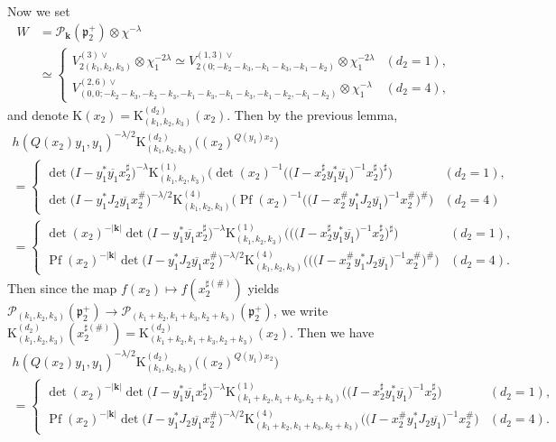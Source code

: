 \documentclass[pdftex]{sigma}
\numberwithin{equation}{section}
\newcommand{\bk}{\mathbf{k}}
\newcommand{\fp}{\mathfrak{p}}
\newcommand{\cP}{\mathcal{P}}
\newcommand{\rK}{\mathrm{K}}
\newcommand{\Pf}{\operatorname{Pf}}
\begin{document}
Now we set
\begin{align*}
W&=\cP_\bk(\fp^+_2)\otimes\chi^{-\lambda} \\
&\simeq \begin{cases} V_{2(k_1,k_2,k_3)}^{(3)\vee}\otimes\chi_1^{-2\lambda}
\simeq V_{2(0;-k_2-k_3,-k_1-k_3,-k_1-k_2)}^{(1,3)\vee}\otimes\chi_1^{-2\lambda} & (d_2=1), \\
V_{(0,0;-k_2-k_3,-k_2-k_3,-k_1-k_3,-k_1-k_3,-k_1-k_2,-k_1-k_2)}^{(2,6)\vee}\otimes\chi_1^{-\lambda} & (d_2=4), \end{cases}
\end{align*}
and denote $\rK(x_2)=\rK_{(k_1,k_2,k_3)}^{(d_2)}(x_2)$. Then by the previous lemma,
\begin{gather*}
 h(Q(x_2)y_1,y_1)^{-\lambda/2}\rK_{(k_1,k_2,k_3)}^{(d_2)}\big((x_2)^{Q(y_1)x_2}\big) \\
 =\begin{cases} \det\big(I-y_1^*\overline{y_1}x_2^\sharp\big)^{-\lambda}\rK_{(k_1,k_2,k_3)}^{(1)}
\big(\det(x_2)^{-1}\big(\big(I-x_2^\sharp y_1^*\overline{y_1}\big)^{-1}x_2^\sharp\big)^\sharp\big) & (d_2=1),\\
\det\big(I-y_1^*J_2\overline{y_1}x_2^\#\big)^{-\lambda/2}\rK_{(k_1,k_2,k_3)}^{(4)}
\big(\Pf(x_2)^{-1}\big(\big(I-x_2^\#y_1^*J_2\overline{y_1}\big)^{-1}x_2^\#\big)^\#\big) & (d_2=4) \end{cases} \\
 =\begin{cases} \det(x_2)^{-|\bk|}\det\big(I-y_1^*\overline{y_1}x_2^\sharp\big)^{-\lambda}\rK_{(k_1,k_2,k_3)}^{(1)}
\big(\big(\big(I-x_2^\sharp y_1^*\overline{y_1}\big)^{-1}x_2^\sharp\big)^\sharp\big) & (d_2=1),\\
\Pf(x_2)^{-|\bk|}\det\big(I-y_1^*J_2\overline{y_1}x_2^\#\big)^{-\lambda/2}\rK_{(k_1,k_2,k_3)}^{(4)}
\big(\big(\big(I-x_2^\#y_1^*J_2\overline{y_1}\big)^{-1}x_2^\#\big)^\#\big) & (d_2=4). \end{cases}
\end{gather*}
Then since the map $f(x_2)\mapsto f(x_2^{\sharp(\#)})$ yields
$\cP_{(k_1,k_2,k_3)}(\fp^+_2)\to \cP_{(k_1+k_2,k_1+k_3,k_2+k_3)}(\fp^+_2)$,
we write $\rK_{(k_1,k_2,k_3)}^{(d_2)}(x_2^{\sharp(\#)})=\rK_{(k_1+k_2,k_1+k_3,k_2+k_3)}^{(d_2)}(x_2)$. Then we have
\begin{gather*}
 h(Q(x_2)y_1,y_1)^{-\lambda/2}\rK_{(k_1,k_2,k_3)}^{(d_2)}\big((x_2)^{Q(y_1)x_2}\big) \\
 =\begin{cases} \det(x_2)^{-|\bk|}\det\!\big(I-y_1^*\overline{y_1}x_2^\sharp\big)^{-\lambda}\rK_{(k_1+k_2,k_1+k_3,k_2+k_3)}^{(1)}
\big(\big(I-x_2^\sharp y_1^*\overline{y_1}\big)^{-1}x_2^\sharp\big) & (d_2=1), \\
\Pf(x_2)^{-|\bk|}\det\!\big(I-y_1^*J_2\overline{y_1}x_2^\#\big)^{-\lambda/2}\rK_{(k_1+k_2,k_1+k_3,k_2+k_3)}^{(4)}
\big(\big(I-x_2^\#y_1^*J_2\overline{y_1}\big)^{-1}x_2^\#\big)\!\!\!\!\! & (d_2=4). \end{cases}
\end{gather*}
\end{document}
